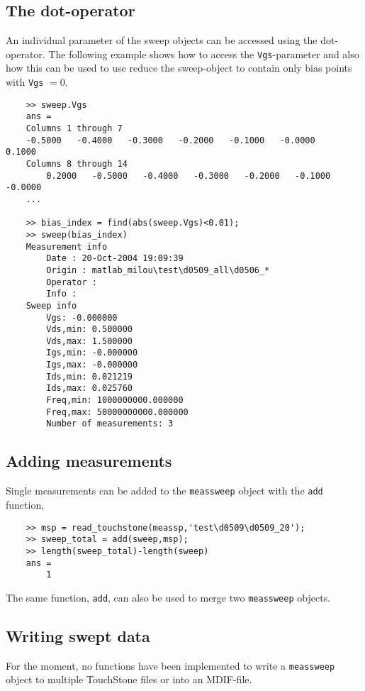 \subsection{The dot-operator}
An individual parameter of the sweep objects can be accessed using
the dot-operator. The following example shows how to access the
\verb"Vgs"-parameter and also how this can be used to use reduce
the sweep-object to contain only bias points with \verb"Vgs" $=0$.
\begin{small}
\begin{verbatim}
    >> sweep.Vgs
    ans =
    Columns 1 through 7
    -0.5000   -0.4000   -0.3000   -0.2000   -0.1000   -0.0000    0.1000
    Columns 8 through 14
        0.2000   -0.5000   -0.4000   -0.3000   -0.2000   -0.1000   -0.0000
    ...

    >> bias_index = find(abs(sweep.Vgs)<0.01);
    >> sweep(bias_index)
    Measurement info
        Date : 20-Oct-2004 19:09:39
        Origin : matlab_milou\test\d0509_all\d0506_*
        Operator :
        Info :
    Sweep info
        Vgs: -0.000000
        Vds,min: 0.500000
        Vds,max: 1.500000
        Igs,min: -0.000000
        Igs,max: -0.000000
        Ids,min: 0.021219
        Ids,max: 0.025760
        Freq,min: 1000000000.000000
        Freq,max: 50000000000.000000
        Number of measurements: 3
\end{verbatim}
\end{small}

\subsection{Adding measurements}
Single measurements can be added to the \verb"meassweep" object
with the \verb"add" function,

\begin{small}
\begin{verbatim}
    >> msp = read_touchstone(meassp,'test\d0509\d0509_20');
    >> sweep_total = add(sweep,msp);
    >> length(sweep_total)-length(sweep)
    ans =
        1
\end{verbatim}
\end{small}
The same function, \verb"add", can also be used to merge two
\verb"meassweep" objects.

\subsection{Writing swept data}
For the moment, no functions have been implemented to write a
\verb"meassweep" object to multiple TouchStone files or into an
MDIF-file.
